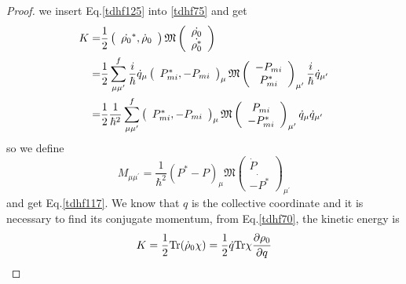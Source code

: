 \begin{proof}
    we insert Eq.\eqref{tdhf125} into \eqref{tdhf75} and get
    \begin{equation}
      \begin{aligned}
        K =& \frac{1}{2}          \label{tdhf126}
        \left(
          \begin{array}{r}
            \dot{\rho_0}^*, \dot{\rho}_0        
          \end{array}
        \right)
        \mathfrak{M}
        \left(
          \begin{array}{c}
            \dot{\rho_0}\\
            \dot{\rho_0^*}
          \end{array}
        \right)\\
        =& \frac{1}{2} \sum_{\mu\mu^\prime}^f \frac{i}{\hbar} \dot{q}_\mu
        \left(
          \begin{array}{r}
            P_{mi}^*, -P_{mi}        
          \end{array}
        \right)_\mu
        \mathfrak{M}
        \left(
          \begin{array}{c}
            -P_{mi}\\
            P_{mi}^*
          \end{array}
        \right)_{\mu^\prime}
        \frac{i}{\hbar} \dot{q}_{\mu\rq}\\
        =& \frac{1}{2} \frac{1}{\hbar^2} \sum_{\mu\mu^\prime}^f 
        \left(
          \begin{array}{r}
            P_{mi}^*, -P_{mi}        
          \end{array}
        \right)_\mu
        \mathfrak{M}
        \left(
          \begin{array}{c}
            P_{mi}\\
            -P_{mi}^*
          \end{array}
        \right)_{\mu^\prime}
        \dot{q}_\mu \dot{q}_{\mu\rq}
      \end{aligned}
    \end{equation}
    so we define
    \begin{equation}
      M_{\mu\mu^{\prime}} = \frac{1}{\hbar^2}(P^* -P)_\mu  \mathfrak{M}	 \label{tdhf127}
        \left(
          \begin{array}{c}
            \dot{P}\\
            \dot{-P^*}
          \end{array}
        \right)_{\mu^\prime} 
    \end{equation}
    and get Eq.\eqref{tdhf117}. We know that $q$ is the collective coordinate and it is necessary to find its conjugate momentum, from Eq.\eqref{tdhf70}, the kinetic energy is 
    \begin{equation}
      K = \frac{1}{2}{\rm Tr}(\dot{\rho}_0\chi) = \frac{1}{2}\dot{q}{\rm Tr}\chi\frac{\partial \rho_0}{\partial q} \label{tdhf128}
    \end{equation}    
  \end{proof}

